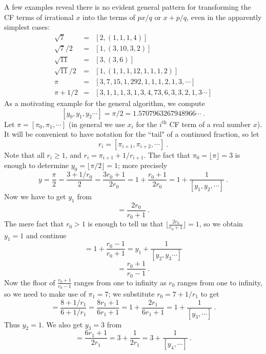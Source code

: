 \documentclass[11pt, oneside]{amsart}   	%
\renewcommand{\:}{\negthickspace:\negthickspace}
\begin{document}
A few examples reveal there is no evident general pattern for transforming the CF terms of irrational $x$ into
the terms of $px/q$ or $x + p/q$, even in the apparently simplest cases:
\begin{eqnarray*}
\sqrt{7} & = & [2, (1, 1, 1, 4)] \\
\sqrt{7}/2 & = & [1, (3, 10, 3, 2)] \\
\sqrt{11} & = & [3, (3, 6)] \\
\sqrt{11}/2 & = & [1, (1, 1, 1, 12, 1, 1, 1, 2)] \\
\pi & = & [3,7,15,1,292,1,1,1, 2, 1, 3,\cdots]\\
\pi + 1/2 & = & [3, 1, 1, 1, 3, 1, 3, 4, 73, 6, 3, 3, 2, 1, 3\cdots]
\end{eqnarray*}
As a motivating example for the general algorithm, we compute
\[[y_0,y_1,y_2 \cdots] = \pi/2 = 1.5707963267948966\cdots\ .
\]
Let $\pi = [\pi_0,\pi_1,\cdots]$ (in general we use $x_i$ for the $i^{\mbox {th}}$ CF term of a real number $x$). It will be convenient to have notation for the ``tail" of a continued fraction, so let
\[
r_i = [\pi_{i+1}, \pi_{i+2},\cdots]\ .
\]
Note that all $r_i \geq 1$, and $r_i = \pi_{i+1} + 1/r_{i+1}$. The fact that $\pi_0 = \lfloor \pi \rfloor= 3$
is enough to determine $y_0=\lfloor \pi/2 \rfloor=1$; more precisely
\begin{equation*}
y = \frac{\pi}{2} = \frac{3 + 1/r_0}{2} = \frac{3r_0+1}{2r_0} = 1 + \frac{r_0+1}{2r_0}= 1 + \frac{1}{[y_1,y_2,\cdots]}\ .
\end{equation*}
Now we have to get $y_1$ from 
\begin{equation*}
[y_1,y_2,\cdots] = \frac{2r_0}{r_0+1}\ .
\end{equation*}
The mere fact that $r_0>1$ is enough to tell us that $\lfloor \frac{2r_0}{r_0+1} \rfloor = 1$, so we obtain $y_1=1$ and continue
\begin{equation*}
[y_1,y_2,\cdots] = 1 + \frac{r_0-1}{r_0+1} = y_1 + \frac{1}{[y_2,y_3\cdots]}
\end{equation*}
\begin{equation*}
[y_2,\cdots] = \frac{r_0+1}{r_0-1} \ .
\end{equation*}
Now the floor of $\frac{r_0+1}{r_0-1}$ ranges from one to infinity as $r_0$ ranges from one to infinity,
so we need to make use of $\pi_1 = 7$; we substitute $r_0 = 7+1/r_1$ to get
\begin{equation*}
[y_2,\cdots] = \frac{8 + 1/r_1}{6 + 1/r_1} = \frac{8r_1 + 1}{6r_1 + 1} = 1 + \frac{2r_1}{6r_1 + 1}= 1 + \frac{1}{[y_3,\cdots]}\ .
\end{equation*}
Thus $y_2=1$.  We also get $y_3 = 3$ from
\begin{equation*}
[y_3,\cdots] =  \frac{6r_1 + 1}{2r_1} = 3 + \frac{1}{2r_1} = 3 + \frac{1}{[y_4,\cdots]}\ .
\end{equation*}
\end{document}
